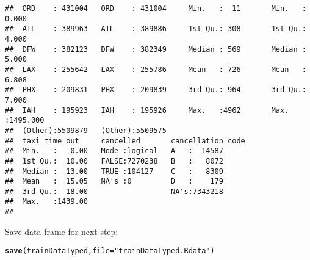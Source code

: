 \documentclass{article}\usepackage[]{graphicx}\usepackage[]{color}
\makeatletter
\newcommand{\hlstr}[1]{\textcolor[rgb]{0.192,0.494,0.8}{#1}}%
\newcommand{\hlstd}[1]{\textcolor[rgb]{0.345,0.345,0.345}{#1}}%
\newcommand{\hlkwc}[1]{\textcolor[rgb]{0.333,0.667,0.333}{#1}}%
\newcommand{\hlkwd}[1]{\textcolor[rgb]{0.737,0.353,0.396}{\textbf{#1}}}%
\newenvironment{kframe}{%
 \def\at@end@of@kframe{}%
 \ifinner\ifhmode%
  \def\at@end@of@kframe{\end{minipage}}%
  \begin{minipage}{\columnwidth}%
 \fi\fi%
 \def\FrameCommand##1{\hskip\@totalleftmargin \hskip-\fboxsep
 \colorbox{shadecolor}{##1}\hskip-\fboxsep
     \hskip-\linewidth \hskip-\@totalleftmargin \hskip\columnwidth}%
 \MakeFramed {\advance\hsize-\width
   \@totalleftmargin\z@ \linewidth\hsize
   \@setminipage}}%
 {\par\unskip\endMakeFramed%
 \at@end@of@kframe}
\newenvironment{knitrout}{}{} %
\makeatother
\begin{document}
\begin{knitrout}
\begin{kframe}
\begin{verbatim}
##  ORD    : 431004   ORD    : 431004     Min.   :  11       Min.   :   0.000  
##  ATL    : 389963   ATL    : 389886     1st Qu.: 308       1st Qu.:   4.000  
##  DFW    : 382123   DFW    : 382349     Median : 569       Median :   5.000  
##  LAX    : 255642   LAX    : 255786     Mean   : 726       Mean   :   6.808  
##  PHX    : 209831   PHX    : 209839     3rd Qu.: 964       3rd Qu.:   7.000  
##  IAH    : 195923   IAH    : 195926     Max.   :4962       Max.   :1495.000  
##  (Other):5509879   (Other):5509575                                          
##  taxi_time_out     cancelled       cancellation_code
##  Min.   :   0.00   Mode :logical   A   :  14587     
##  1st Qu.:  10.00   FALSE:7270238   B   :   8072     
##  Median :  13.00   TRUE :104127    C   :   8309     
##  Mean   :  15.05   NA's :0         D   :    179     
##  3rd Qu.:  18.00                   NA's:7343218     
##  Max.   :1439.00                                    
## 
\end{verbatim}
\end{kframe}
\end{knitrout}

Save data frame for next step:
\begin{knitrout}
\color{fgcolor}\begin{kframe}
\begin{alltt}
\hlkwd{save}\hlstd{(trainDataTyped,} \hlkwc{file}\hlstd{=}\hlstr{"trainDataTyped.Rdata"}\hlstd{)}
\end{alltt}
\end{kframe}
\end{knitrout}


\end{document}
